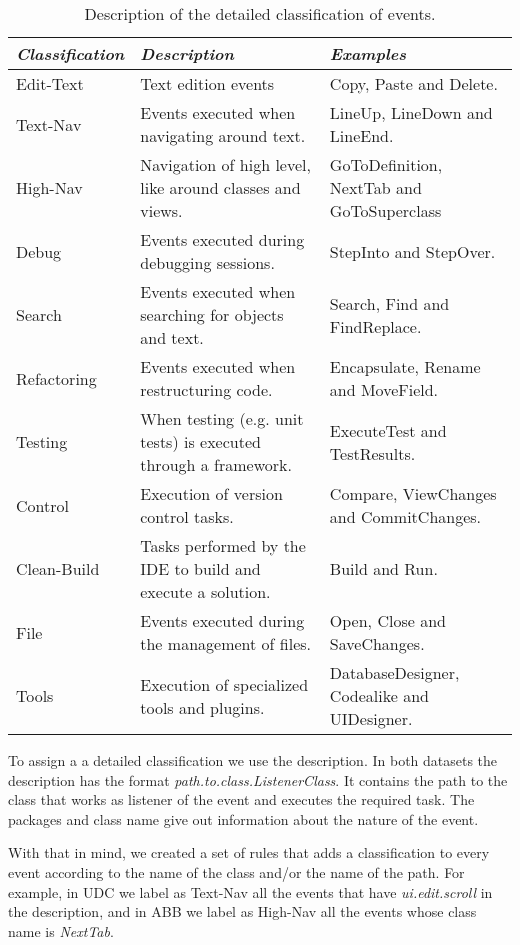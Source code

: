 \begin{table}[ht!]
	\small
	\caption{Description of the detailed classification of events. }
	\label{tbl:detailed_events}
	\centering
	\begin{tabular}{p{2cm}|p{4.5cm}|p{4.5cm}} 
		\hline 
		\emph{Classification} & \emph{Description} & \emph{Examples} \\  
		\hline 
		\hline 
		Edit-Text &  Text edition events & Copy, Paste and Delete. \\
		\hline
		Text-Nav & Events executed when navigating around text. & LineUp, LineDown and LineEnd.  \\
		\hline
		High-Nav & Navigation of high level, like around classes and views. & GoToDefinition, NextTab and GoToSuperclass \\
		\hline
		Debug & Events executed during debugging sessions. & StepInto and StepOver. \\
		\hline
		Search & Events executed when searching for objects and text. & Search, Find and FindReplace. \\
		\hline
		Refactoring & Events executed when restructuring code. & Encapsulate, Rename and MoveField. \\
		\hline
		Testing & When testing (e.g. unit tests) is executed through a framework. & ExecuteTest and TestResults. \\
		\hline
		Control & Execution of version control tasks. & Compare, ViewChanges and CommitChanges. \\
		\hline
		Clean-Build & Tasks performed by the IDE to build and execute a solution.  & Build and Run. \\
		\hline
		File & Events executed during the management of files. & Open, Close and SaveChanges. \\
		\hline
		Tools & Execution of specialized tools and plugins. & DatabaseDesigner, Codealike and UIDesigner.\\
		\hline
	\end{tabular}
	
\end{table}

To assign a a detailed classification we use the description. In both datasets the description has the format \emph{path.to.class.ListenerClass}. It contains the path to the class that works as listener of the event and executes the required task. The packages and class name give out information about the nature of the event.

With that in mind, we created a set of rules that adds a classification to every event according to the name of the class and/or the name of the path. For example, in UDC we label as Text-Nav all the events that have \emph{ui.edit.scroll} in the description, and in ABB we label as High-Nav all the events whose class name is \emph{NextTab}.

